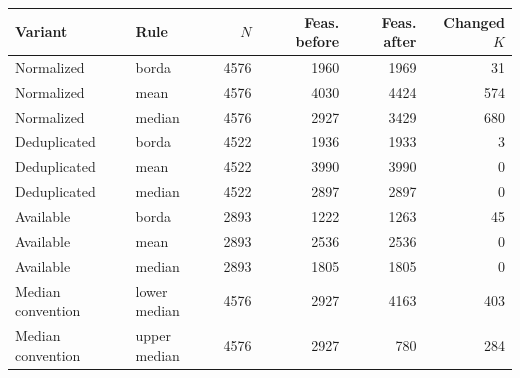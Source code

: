 \begin{tabular}{llrrrr}
\toprule
Variant & Rule & $N$ & Feas. before & Feas. after & Changed $K$\\
\midrule
Normalized & borda & 4576 & 1960 & 1969 & 31 \\ 
Normalized & mean & 4576 & 4030 & 4424 & 574 \\ 
Normalized & median & 4576 & 2927 & 3429 & 680 \\ 
Deduplicated & borda & 4522 & 1936 & 1933 & 3 \\ 
Deduplicated & mean & 4522 & 3990 & 3990 & 0 \\ 
Deduplicated & median & 4522 & 2897 & 2897 & 0 \\ 
Available & borda & 2893 & 1222 & 1263 & 45 \\ 
Available & mean & 2893 & 2536 & 2536 & 0 \\ 
Available & median & 2893 & 1805 & 1805 & 0 \\ 
Median convention & lower median & 4576 & 2927 & 4163 & 403 \\ 
Median convention & upper median & 4576 & 2927 & 780 & 284 \\ 
\bottomrule
\end{tabular}